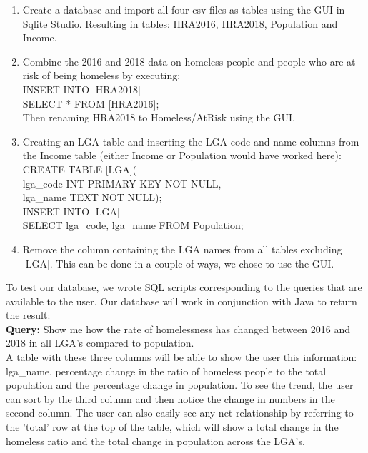 \documentclass[12pt, a4paper]{article}
\begin{document}
\begin{enumerate}
\item Create a database and import all four csv files as tables using the GUI in Sqlite Studio. Resulting in tables: HRA2016, HRA2018, Population and Income.
\item Combine the 2016 and 2018 data on homeless people and people who are at risk of being homeless by executing: \\
\hspace*{10mm}%
INSERT INTO [HRA2018]\\
\hspace*{10mm}%
SELECT * FROM [HRA2016];\\
Then renaming HRA2018 to Homeless/AtRisk using the GUI.
\item Creating an LGA table and inserting the LGA code and name columns from the Income table (either Income or Population would have worked here):\\
\hspace*{10mm}%
CREATE TABLE [LGA](\\
\hspace*{10mm}%
lga\_code INT PRIMARY KEY NOT NULL,\\
\hspace*{10mm}%
lga\_name TEXT NOT NULL);\\
\hspace*{10mm}%
INSERT INTO [LGA]\\
\hspace*{10mm}%
SELECT lga\_code, lga\_name FROM Population;
\item Remove the column containing the LGA names from all tables excluding [LGA]. This can be done in a couple of ways, we chose to use the GUI.
\end{enumerate}
To test our database, we wrote SQL scripts corresponding to the queries that are available to the user. Our database will work in conjunction with Java to return the result: \\
\textbf{Query:} Show me how the rate of homelessness has changed between 2016 and 2018 in all LGA's compared to population.\\
A table with these three columns will be able to show the user this information: lga\_name, percentage change in the ratio of homeless people to the total population and the percentage change in population. To see the trend, the user can sort by the third column and then notice the change in numbers in the second column. The user can also easily see any net relationship by referring to the 'total' row at the top of the table, which will show a total change in the homeless ratio and the total change in population across the LGA's. \\
\end{document}
